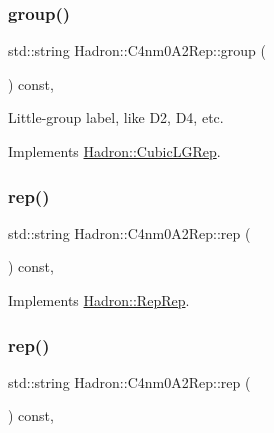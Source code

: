 \subsubsection{\texorpdfstring{group()}{group()}\hspace{0.1cm}{\footnotesize\ttfamily [5/5]}}
{\footnotesize\ttfamily std\+::string Hadron\+::\+C4nm0\+A2\+Rep\+::group (\begin{DoxyParamCaption}{ }\end{DoxyParamCaption}) const\hspace{0.3cm}{\ttfamily [inline]}, {\ttfamily [virtual]}}

Little-\/group label, like D2, D4, etc. 

Implements \mbox{\hyperlink{structHadron_1_1CubicLGRep_a9bdb14b519a611d21379ed96a3a9eb41}{Hadron\+::\+Cubic\+L\+G\+Rep}}.

\mbox{\label{structHadron_1_1C4nm0A2Rep_a33fdf55c4518f4e03005b1fc05271695}} 
\subsubsection{\texorpdfstring{rep()}{rep()}\hspace{0.1cm}{\footnotesize\ttfamily [1/5]}}
{\footnotesize\ttfamily std\+::string Hadron\+::\+C4nm0\+A2\+Rep\+::rep (\begin{DoxyParamCaption}{ }\end{DoxyParamCaption}) const\hspace{0.3cm}{\ttfamily [inline]}, {\ttfamily [virtual]}}



Implements \mbox{\hyperlink{structHadron_1_1RepRep_ab3213025f6de249f7095892109575fde}{Hadron\+::\+Rep\+Rep}}.

\mbox{\label{structHadron_1_1C4nm0A2Rep_a33fdf55c4518f4e03005b1fc05271695}} 
\subsubsection{\texorpdfstring{rep()}{rep()}\hspace{0.1cm}{\footnotesize\ttfamily [2/5]}}
{\footnotesize\ttfamily std\+::string Hadron\+::\+C4nm0\+A2\+Rep\+::rep (\begin{DoxyParamCaption}{ }\end{DoxyParamCaption}) const\hspace{0.3cm}{\ttfamily [inline]}, {\ttfamily [virtual]}}



